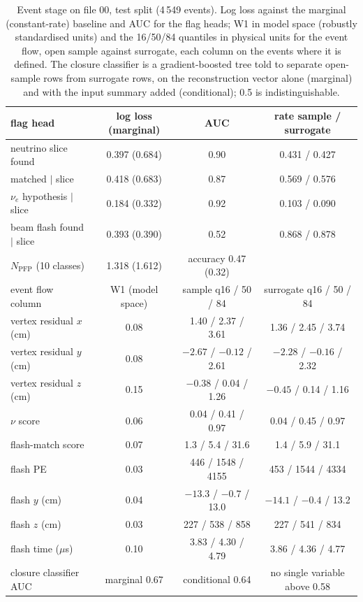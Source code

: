 \documentclass[10pt,letterpaper]{article}
\begin{document}
\begin{table}[htbp]\centering\small
\caption{Event stage on file 00, test split (4\,549 events). Log loss against the marginal (constant-rate) baseline and
AUC for the flag heads; W1 in model space (robustly standardised units) and the 16/50/84 quantiles in physical units
for the event flow, open sample against surrogate, each column on the events where it is defined. The closure
classifier is a gradient-boosted tree told to separate open-sample rows from surrogate rows, on the reconstruction
vector alone (marginal) and with the input summary added (conditional); 0.5 is indistinguishable.}\label{tab:first}
\begin{tabular}{@{}lccc@{}}\toprule
flag head & log loss (marginal) & AUC & rate sample / surrogate\\ \midrule
neutrino slice found & 0.397 (0.684) & 0.90 & 0.431 / 0.427\\
matched $\mid$ slice & 0.418 (0.683) & 0.87 & 0.569 / 0.576\\
$\nu_e$ hypothesis $\mid$ slice & 0.184 (0.332) & 0.92 & 0.103 / 0.090\\
beam flash found $\mid$ slice & 0.393 (0.390) & 0.52 & 0.868 / 0.878\\
$N_\text{PFP}$ (10 classes) & 1.318 (1.612) & accuracy 0.47 (0.32) & \\
\midrule
event flow column & W1 (model space) & sample q16 / 50 / 84 & surrogate q16 / 50 / 84\\ \midrule
vertex residual $x$ (cm) & 0.08 & 1.40 / 2.37 / 3.61 & 1.36 / 2.45 / 3.74\\
vertex residual $y$ (cm) & 0.08 & $-2.67$ / $-0.12$ / 2.61 & $-2.28$ / $-0.16$ / 2.32\\
vertex residual $z$ (cm) & 0.15 & $-0.38$ / 0.04 / 1.26 & $-0.45$ / 0.14 / 1.16\\
$\nu$ score & 0.06 & 0.04 / 0.41 / 0.97 & 0.04 / 0.45 / 0.97\\
flash-match score & 0.07 & 1.3 / 5.4 / 31.6 & 1.4 / 5.9 / 31.1\\
flash PE & 0.03 & 446 / 1548 / 4155 & 453 / 1544 / 4334\\
flash $y$ (cm) & 0.04 & $-13.3$ / $-0.7$ / 13.0 & $-14.1$ / $-0.4$ / 13.2\\
flash $z$ (cm) & 0.03 & 227 / 538 / 858 & 227 / 541 / 834\\
flash time ($\mu$s) & 0.10 & 3.83 / 4.30 / 4.79 & 3.86 / 4.36 / 4.77\\
\midrule
closure classifier AUC & marginal 0.67 & conditional 0.64 & no single variable above 0.58\\
\bottomrule\end{tabular}
\end{table}
\end{document}
